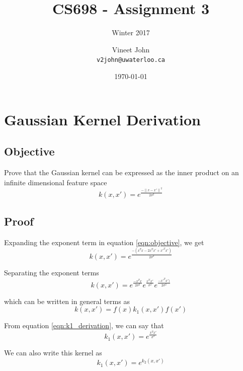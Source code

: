 \documentclass[parskip=full]{scrartcl}
\begin{document}
\title{CS698 - Assignment 3}
\subtitle{Winter 2017}
\author{
    Vineet John\\
    \texttt{v2john@uwaterloo.ca}
}
\date{\today}
\maketitle


\section{Gaussian Kernel Derivation} %
\label{sec:gaussian_kernel_derivation}

    \subsection*{Objective} %
    \label{sub:objective}
        Prove that the Gaussian kernel can be expressed as the inner product on an infinite dimensional feature space
        \begin{equation} \label{eqn:objective}
            k(x, x\prime) = e^{\frac{- {\lVert x - x\prime \rVert}^2}{2\sigma^2}}
        \end{equation}


    \subsection*{Proof} %
    \label{sub:proof}

        Expanding the exponent term in equation \ref{eqn:objective}, we get
        $$k(x, x\prime) = e^{\frac{-(x^Tx - 2x^Tx\prime + x\prime^Tx\prime)}{2\sigma^2}}$$

        Separating the exponent terms
        $$k(x, x\prime) = e^{\frac{-x^Tx}{2\sigma^2}} e^{\frac{x^Tx\prime}{\sigma^2}} e^{\frac{- x\prime^Tx\prime)}{2\sigma^2}}$$

        which can be written in general terms as
        \begin{equation} \label{eqn:k1_derivation}
            k(x, x\prime) = f(x) k_1(x, x\prime) f(x\prime)
        \end{equation}

        From equation \ref{eqn:k1_derivation}, we can say that
        $$k_1(x, x\prime) = e^{\frac{x^Tx\prime}{\sigma^2}} $$

        We can also write this kernel as 
        \begin{equation} \label{eqn:k2_derivation}
            k_1(x, x\prime) = e^{k_2(x, x\prime)}
        \end{equation}
\end{document}
